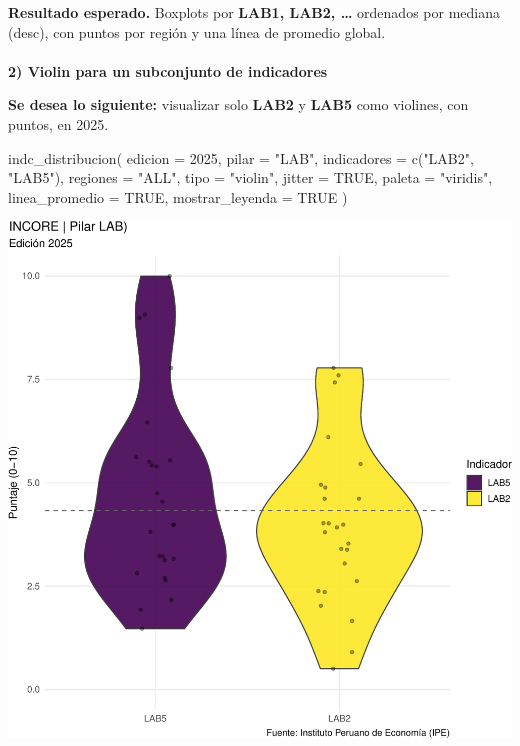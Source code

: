 \documentclass[
  11pt,
  letterpaper,
  DIV=11,
  numbers=noendperiod]{scrartcl}
\makeatletter
\let\oldparagraph\paragraph
\renewcommand{\paragraph}{
    \@ifstar
      \xxxParagraphStar
      \xxxParagraphNoStar
  }
\newcommand{\xxxParagraphStar}[1]{\oldparagraph*{#1}\mbox{}}
\newcommand{\xxxParagraphNoStar}[1]{\oldparagraph{#1}\mbox{}}
\newenvironment{Shaded}{\begin{snugshade}}{\end{snugshade}}
\newcommand{\AttributeTok}[1]{\textcolor[rgb]{0.40,0.45,0.13}{#1}}
\newcommand{\ConstantTok}[1]{\textcolor[rgb]{0.56,0.35,0.01}{#1}}
\newcommand{\DecValTok}[1]{\textcolor[rgb]{0.68,0.00,0.00}{#1}}
\newcommand{\FunctionTok}[1]{\textcolor[rgb]{0.28,0.35,0.67}{#1}}
\newcommand{\NormalTok}[1]{\textcolor[rgb]{0.00,0.23,0.31}{#1}}
\newcommand{\StringTok}[1]{\textcolor[rgb]{0.13,0.47,0.30}{#1}}
\makeatother
\begin{document}
\textbf{Resultado esperado.} Boxplots por \textbf{LAB1, LAB2, \ldots{}}
ordenados por mediana (desc), con puntos por región y una línea de
promedio global.

\paragraph{\texorpdfstring{\textbf{2) Violin para un subconjunto de
indicadores}}{2) Violin para un subconjunto de indicadores}}\label{violin-para-un-subconjunto-de-indicadores-1}

\textbf{Se desea lo siguiente:} visualizar solo \textbf{LAB2} y
\textbf{LAB5} como violines, con puntos, en 2025.

\begin{Shaded}
\begin{Highlighting}[]
\FunctionTok{indc\_distribucion}\NormalTok{(}
  \AttributeTok{edicion         =} \DecValTok{2025}\NormalTok{,}
  \AttributeTok{pilar           =} \StringTok{"LAB"}\NormalTok{,}
  \AttributeTok{indicadores     =} \FunctionTok{c}\NormalTok{(}\StringTok{"LAB2"}\NormalTok{, }\StringTok{"LAB5"}\NormalTok{),}
  \AttributeTok{regiones        =} \StringTok{"ALL"}\NormalTok{,}
  \AttributeTok{tipo            =} \StringTok{"violin"}\NormalTok{,}
  \AttributeTok{jitter          =} \ConstantTok{TRUE}\NormalTok{,}
  \AttributeTok{paleta          =} \StringTok{"viridis"}\NormalTok{,}
  \AttributeTok{linea\_promedio  =} \ConstantTok{TRUE}\NormalTok{,}
  \AttributeTok{mostrar\_leyenda =} \ConstantTok{TRUE}
\NormalTok{)}
\end{Highlighting}
\end{Shaded}

\includegraphics{Manual_files/figure-pdf/unnamed-chunk-98-1.pdf}
\end{document}
